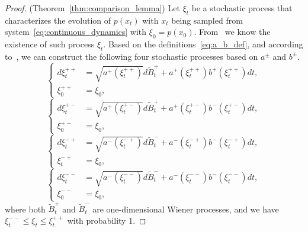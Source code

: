\documentclass[letterpaper]{article} %
\begin{document}
\begin{proof}(Theorem~\ref{thm:comparison_lemma})
    Let $\xi_t$ be a stochastic process that characterizes the evolution of $p(x_t)$ with $x_t$ being sampled from system~\eqref{eq:continuous_dynamics} with $\xi_0 = p(x_0)$. From~\cite[Theorem 3.1]{ikeda1977comparison} we know the existence of such process $\xi_t$.
    Based on the definitions~\eqref{eq:a_b_def}, and according to~\cite[Theorem 3.1]{ikeda1977comparison}, we can construct the following four stochastic processes based on $a^\pm$ and $b^\pm$.
    \begin{equation}
    \label{eq:xi_process_++}
    \left\{\begin{aligned}
d \xi_t^{++} & =\sqrt{a^{+}\left(\xi_t^{++}\right)} d \widetilde{B}_t^{+}+a^{+}\left(\xi_t^{++}\right) b^{+}\left(\xi_t^{++}\right) d t, \\
\xi_0^{++} & =\xi_0 ,
\end{aligned}\right.
    \end{equation}
    \begin{equation}
    \label{eq:xi_process_+-}
        \left\{\begin{aligned}
d \xi_t^{+-} & =\sqrt{a^{+}\left(\xi_t^{+-}\right)} d \widetilde{B}_t^{+}+a^{+}\left(\xi_t^{+-}\right) b^{-}\left(\xi_t^{+-}\right) d t, \\
\xi_0^{+-} & =\xi_0,
\end{aligned}\right.
    \end{equation}
    \begin{equation}
    \label{eq:xi_process_-+}
        \left\{\begin{aligned}
d \xi_t^{-+} & =\sqrt{a^{-}\left(\xi_t^{-+}\right)} d \tilde{B}_t^{-}+a^{-}\left(\xi_t^{-+}\right) b^{-}\left(\xi_t^{-+}\right) d t, \\
\xi_t^{-+} & =\xi_0,
\end{aligned}\right.
    \end{equation}
    \begin{equation}
    \label{eq:xi_process_--}
        \left\{\begin{aligned}
d \xi_t^{--} & =\sqrt{a^{-}\left(\xi_t^{--}\right)} d \tilde{B}_t^{-}+a^{-}\left(\xi_t^{--}\right) b^{-}\left(\xi_t^{--}\right) d t, \\
\xi_0^{--} & =\xi_0,
\end{aligned}\right.
    \end{equation}
    where both $\widetilde{B}_t^{+}$ and $\widetilde{B}_t^{-}$ are one-dimensional Wiener processes, and we have $\xi_t^{--} \leq  \xi_t \leq \xi_t^{++}$ with probability 1.
    

\end{proof}
\end{document}
